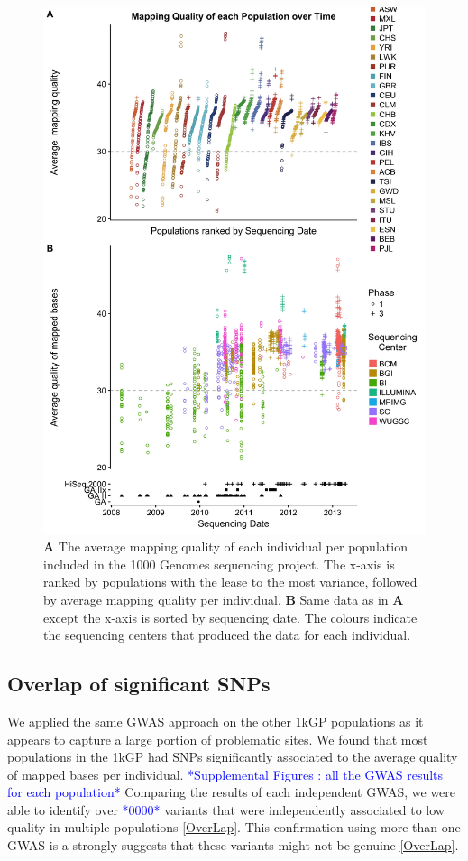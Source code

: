 \documentclass[9pt,lineno]{elife}
\newcommand{\todo}[1]{\textcolor{blue}{*#1*}}
\begin{document}
\begin{figure}
\includegraphics[width=\hsize,keepaspectratio]{MapQualOverTime.jpg}

\caption{\textbf{A} The average mapping quality of each individual per population included in the 1000 Genomes sequencing project. The x-axis is ranked by populations with the lease to the most variance, followed by average mapping quality per individual. \textbf{B} Same data as in \textbf{A} except the x-axis is sorted by sequencing date. The colours indicate the sequencing centers that produced the data for each individual.}
\label{MapQual}
\end{figure}

	\subsection{Overlap of significant SNPs}

We applied the same GWAS approach on the other 1kGP populations as it appears to capture a large portion of problematic sites. 
We found that most populations in the 1kGP had SNPs significantly associated to the average quality of mapped bases per individual.
\todo{Supplemental Figures : all the GWAS results for each population}
Comparing the results of each independent GWAS, we were able to identify over \todo{0000} variants that were independently associated to low quality in multiple populations  \ref{OverLap}. 
This confirmation using more than one GWAS is a strongly suggests that these variants might not be genuine \ref{OverLap}.
\end{document}
